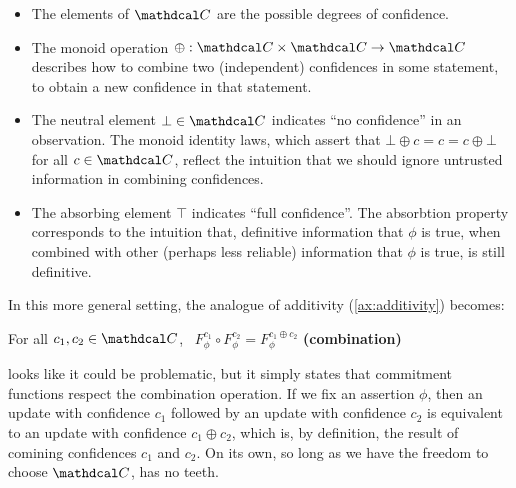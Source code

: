\documentclass{uai2023}
\theoremstyle{plain}
\theoremstyle{definition}
\newcommand\cofunc{commitment function}
\newcommand\confdom{\mathdcal C}
\begin{document}
\begin{itemize}\item
	The elements of $\confdom$ are the possible degrees of confidence.

	\item
	The monoid operation $\oplus : \confdom \times \confdom \to \confdom$ describes how to combine two (independent) confidences in some statement, to obtain a new confidence in that statement.

	\item The neutral element $\bot \in \confdom$ indicates ``no confidence'' in an observation.
The monoid identity laws, which assert that
		$\bot \oplus c = c = c \oplus \bot$ for all $c \in \confdom$,
	reflect the intuition that we should ignore untrusted information in combining confidences.
\item The absorbing element $\top$ indicates ``full confidence''.
	The absorbtion property corresponds to the intuition that, definitive information that $\phi$ is true, when combined with other (perhaps less reliable) information that $\phi$ is true, is still definitive.
\end{itemize}


In this more general setting, the analogue of additivity (\cref{ax:additivity}) becomes:
\begin{CFaxioms}
	\item For all $c_1, c_2 \in \confdom$,~
$F^{c_1}_\phi \circ F^{c_2}_\phi = F^{c_1 \oplus c_2}_\phi$
\hfill \textbf{(combination)} \label{ax:additivity}
\end{CFaxioms}
 looks like it could be problematic, but it simply states that \cofunc s respect the combination operation.
If we fix an assertion $\phi$, then an update with confidence $c_1$ followed by an update with confidence $c_2$ is equivalent to an update with confidence $c_1 \oplus c_2$, which is, by definition, the result of comining confidences $c_1$ and $c_2$.
On its own, so long as we have the freedom to choose $\confdom$,  has no teeth.
\end{document}

